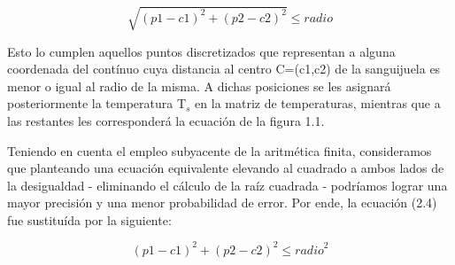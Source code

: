 \documentclass[double, 1.5in, 12pt]{beavtex}
\begin{document}
\begin{equation}
\sqrt{{(p1-c1)}^2 + {(p2-c2)}^2}  \leq  radio
\end{equation}

Esto lo cumplen aquellos puntos discretizados que representan a alguna coordenada del cont\'inuo cuya distancia al centro C=(c1,c2) de la sanguijuela  es menor o igual al radio de la misma. A dichas posiciones se les asignar\'a posteriormente la temperatura T$_s$ en la matriz de temperaturas, mientras que a las restantes les corresponder\'a la ecuaci\'on de la figura 1.1.

Teniendo en cuenta el empleo subyacente de la aritm\'etica finita, consideramos que planteando una ecuaci\'on equivalente elevando al cuadrado a ambos lados de la desigualdad - eliminando el c\'alculo de la ra\'iz cuadrada - podr\'iamos lograr una mayor precisi\'on y una menor probabilidad de error. Por ende, la ecuaci\'on (2.4) fue sustitu\'ida por la siguiente:

\begin{equation}
{(p1-c1)}^2 + {(p2-c2)}^2  \leq  {radio}^2
\end{equation}
\end{document}
